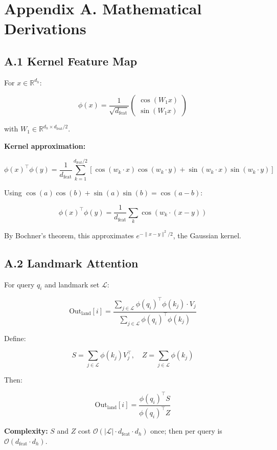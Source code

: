 \section{Appendix A. Mathematical Derivations}

\subsection{A.1 Kernel Feature Map}

For $x \in \mathbb{R}^{d_h}$:

\[
\phi(x) = \frac{1}{\sqrt{d_\text{feat}}} \begin{pmatrix} \cos(W_1 x) \\ \sin(W_1 x) \end{pmatrix}
\tag{A.1}
\]

with $W_1 \in \mathbb{R}^{d_h \times d_\text{feat}/2}$.

\textbf{Kernel approximation:}

\[
\phi(x)^\top \phi(y) = \frac{1}{d_\text{feat}} \sum_{k=1}^{d_\text{feat}/2} [\cos(w_k \cdot x) \cos(w_k \cdot y) + \sin(w_k \cdot x) \sin(w_k \cdot y)]
\tag{A.2}
\]

Using $\cos(a)\cos(b) + \sin(a)\sin(b) = \cos(a - b)$:

\[
\phi(x)^\top \phi(y) = \frac{1}{d_\text{feat}} \sum_k \cos(w_k \cdot (x - y))
\tag{A.3}
\]

By Bochner's theorem, this approximates $e^{-\|x-y\|^2/2}$, the Gaussian kernel.

\subsection{A.2 Landmark Attention}

For query $q_i$ and landmark set $\mathcal{L}$:

\[
\text{Out}_\text{land}[i] = \frac{\sum_{j \in \mathcal{L}} \phi(q_i)^\top \phi(k_j) \cdot V_j}{\sum_{j \in \mathcal{L}} \phi(q_i)^\top \phi(k_j)}
\tag{A.4}
\]

Define:

\[
S = \sum_{j \in \mathcal{L}} \phi(k_j) V_j^\top, \quad Z = \sum_{j \in \mathcal{L}} \phi(k_j)
\tag{A.5}
\]

Then:

\[
\text{Out}_\text{land}[i] = \frac{\phi(q_i)^\top S}{\phi(q_i)^\top Z}
\tag{A.6}
\]

\textbf{Complexity:} $S$ and $Z$ cost $\mathcal{O}(|\mathcal{L}| \cdot d_\text{feat} \cdot d_h)$ 
once; then per query is $\mathcal{O}(d_\text{feat} \cdot d_h)$.

